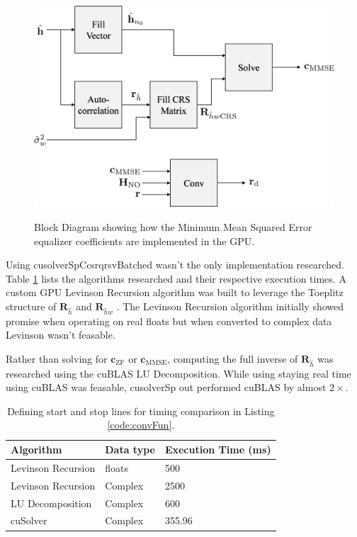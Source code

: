 \begin{figure}
	\caption{Block Diagram showing how the Minimum Mean Squared Error equalizer coefficients are implemented in the GPU.}
	\centering\includegraphics[width=7.98in/100*55]{figures/eq_GPUimplementation/blockMMSE.pdf}
	\label{fig:blockMMSE}
\end{figure}

Using cusolverSpCcsrqrsvBatched wasn't the only implementation researched.
Table \ref{tab:ZFMMSEtimingComparison} lists the algorithms researched and their respective execution times.
A custom GPU Levinson Recursion algorithm was built to leverage the Toeplitz structure of $\mathbf{R}_{\hat{h}}$ and $\mathbf{R}_{\hat{h}w}$ \cite[Chap. 5]{hayes:1996}. 
The Levinson Recursion algorithm initially showed promise when operating on real floats but when converted to complex data Levinson wasn't feasable.

Rather than solving for $\mathbf{c}_\text{ZF}$ or $\mathbf{c}_\text{MMSE}$, computing the full inverse of $\mathbf{R}_{\hat{h}}$ was researched using the cuBLAS LU Decomposition.
While using staying real time using cuBLAS was feasable, cusolverSp out performed cuBLAS by almost $2\times$.
\begin{table}
\caption{Defining start and stop lines for timing comparison in Listing \ref{code:convFun}.}
\begin{center}
\begin{tabular}{lll}
	\toprule
	Algorithm 			& Data type	& Execution Time (ms)	\\ \midrule
	Levinson Recursion 	& floats 	& 500 					\\
	Levinson Recursion 	& Complex 	& 2500 					\\
	LU Decomposition 	& Complex 	& 600				 	\\
	cuSolver			& Complex	& 355.96				\\
	\bottomrule
\end{tabular}
\end{center}
\label{tab:ZFMMSEtimingComparison}
\end{table}


